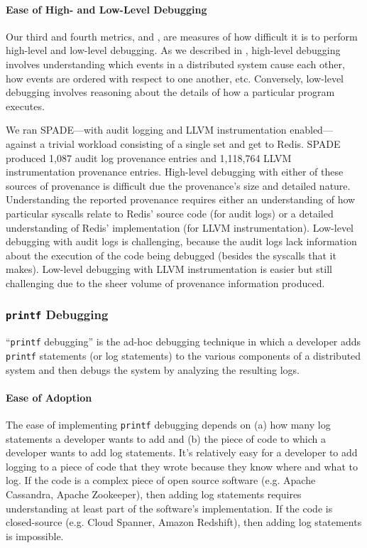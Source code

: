 \paragraph{Ease of High- and Low-Level Debugging}
Our third and fourth metrics,  and
, are measures of how difficult it is to
perform high-level and low-level debugging. As we described in
, high-level debugging involves understanding which
events in a distributed system cause each other, how events are ordered with
respect to one another, etc. Conversely, low-level debugging involves reasoning
about the details of how a particular program executes.

We ran SPADE---with audit logging and LLVM instrumentation enabled---against a
trivial workload consisting of a single set and get to Redis. SPADE produced
1,087 audit log provenance entries and 1,118,764 LLVM instrumentation
provenance entries. High-level debugging with either of these sources of
provenance is difficult due the provenance's size and detailed nature.
Understanding the reported provenance requires either an understanding of how
particular syscalls relate to Redis' source code (for audit logs) or a detailed
understanding of Redis' implementation (for LLVM instrumentation). Low-level
debugging with audit logs is challenging, because the audit logs lack
information about the execution of the code being debugged (besides the
syscalls that it makes). Low-level debugging with LLVM instrumentation is easier
but still challenging due to the sheer volume of provenance information
produced.

\newcommand{\printf}{\texttt{printf}}
\subsubsection{\printf{} Debugging}
``\printf{} debugging'' is the ad-hoc debugging technique in which a developer
adds \printf{} statements (or log statements) to the various components of a
distributed system and then debugs the system by analyzing the resulting logs.

\paragraph{Ease of Adoption}
The ease of implementing \printf{} debugging depends on (a) how many log
statements a developer wants to add and (b) the piece of code to which a
developer wants to add log statements. It's relatively easy for a developer to
add logging to a piece of code that they wrote because they know where and what
to log. If the code is a complex piece of open source software (e.g. Apache
Cassandra, Apache Zookeeper), then adding log statements requires understanding
at least part of the software's implementation. If the code is closed-source
(e.g. Cloud Spanner, Amazon Redshift), then adding log statements is
impossible.

